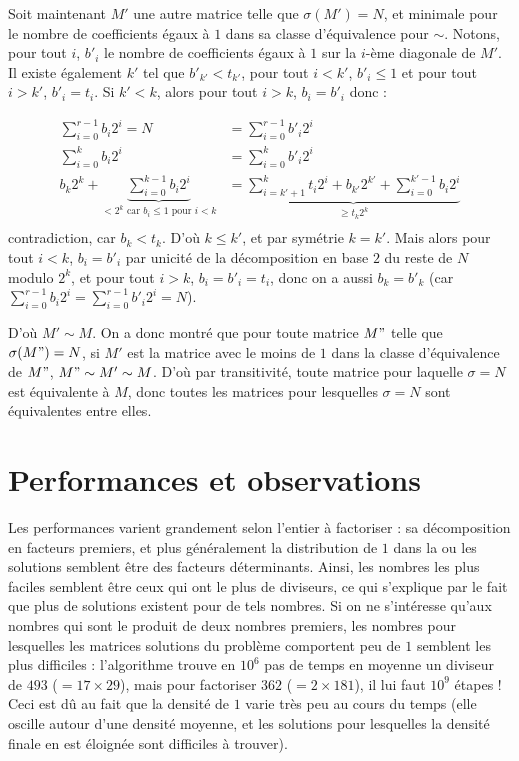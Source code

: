 \documentclass[11pt, openany]{article}
\begin{document}
Soit maintenant $M'$ une autre matrice telle que $\sigma (M')=N$, et minimale pour le nombre de coefficients égaux à $1$ dans sa classe d'équivalence pour $\sim$. Notons, pour tout $i$, $b'_i$ le nombre de coefficients égaux à $1$ sur la $i$-ème diagonale de $M'$. Il existe également $k'$ tel que $b'_{k'} < t_{k'}$, pour tout $i<k'$, $b'_i \leq 1$ et pour tout $i>k'$, $b'_i=t_i$. Si $k'<k$, alors pour tout $i>k$, $b_i= b'_i$ donc : 


\begin{align*}
\sum\limits_{i=0}^{r-1}b_i 2^i = N &= \sum\limits_{i=0}^{r-1}b'_i 2^i\\
\sum\limits_{i=0}^k b_i 2^i &= \sum\limits_{i=0}^k b'_i 2^i\\
b_k 2^k + \underbrace{\sum\limits_{i=0}^{k-1} b_i 2^i}_{\text{$< 2^k$ car $b_i \leq 1$ pour $i<k$}} &=\underbrace{\sum\limits_{i=k'+1}^k t_i 2^i + b_{k'} 2^{k'} + \sum\limits_{i=0}^{k' -1} b_i 2^i}_{\geq t_k 2^k}\\
\end{align*}
contradiction, car $b_k<t_k$. D'où $k \leq k'$, et par symétrie $k = k'$. Mais alors pour tout $i<k$, $b_i = b'_i$ par unicité de la décomposition en base $2$ du reste de $N$ modulo $2^k$, et pour tout $i>k$, $b_i = b'_i = t_i$, donc on a aussi $b_k = b'_k$ (car $\sum\limits_{i=0}^{r-1} b_i 2^i = \sum\limits_{i=0}^{r-1} b'_i 2^i = N$).

D'où $M' \sim M$. On a donc montré que pour toute matrice $M"$ telle que $\sigma(M")=N$, si $M'$ est la matrice avec le moins de $1$ dans la classe d'équivalence de $M"$, $M"\sim M' \sim M$. D'où par transitivité, toute matrice pour laquelle $\sigma=N$ est équivalente à $M$, donc toutes les matrices pour lesquelles $\sigma=N$ sont équivalentes entre elles.



\section*{Performances et observations}

Les performances varient grandement selon l'entier à factoriser : sa dé\-composition en facteurs premiers, et plus généralement la distribution de $1$ dans la ou les solutions semblent être des facteurs déterminants. Ainsi, les nombres les plus faciles semblent être ceux qui ont le plus de diviseurs, ce qui s'explique par le fait que plus de solutions existent pour de tels nombres. Si on ne s'intéresse qu'aux nombres qui sont le produit de deux nombres premiers, les nombres pour lesquelles les matrices solutions du problème comportent peu de $1$ semblent les plus difficiles : l'algorithme trouve en $10^6$ pas de temps en moyenne un diviseur de $493$ ($ = 17\times 29$), mais pour factoriser $362$ ($ = 2\times 181$), il lui faut $10^9$ étapes ! Ceci est dû au fait que la densité de $1$ varie très peu au cours du temps (elle oscille autour d'une densité moyenne, et les solutions pour lesquelles la densité finale en est éloignée sont difficiles à trouver). 
\end{document}
